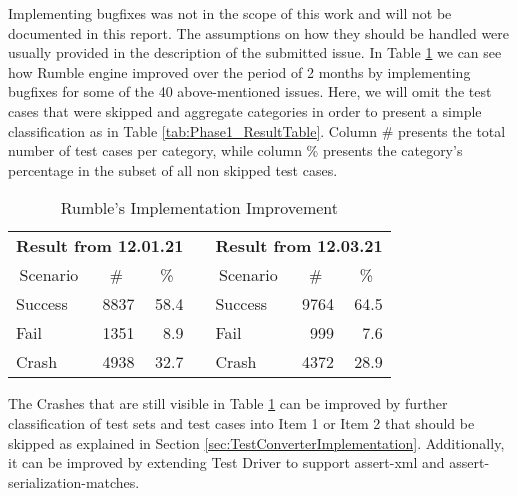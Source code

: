 Implementing bugfixes was not in the scope of this work and will not be documented in this report. The assumptions on how they should be handled were usually provided in the description of the submitted issue. In Table \ref{tab:bugsimprovement} we can see how Rumble engine improved over the period of 2 months by implementing bugfixes for some of the 40 above-mentioned issues. Here, we will omit the test cases that were skipped and aggregate categories in order to present a simple classification as in Table \ref{tab:Phase1_ResultTable}. Column \# presents the total number of test cases per category, while column \% presents the category's percentage in the subset of all non skipped test cases.
 
\begin{table}[h!]
	\centering
	\begin{tabular}{|l|r|r|r|l|r|r|}
		\cline{1-3} \cline{5-7}
		\multicolumn{3}{|c|}{\textbf{Result from 12.01.21}}                                & \multicolumn{1}{l|}{}          & \multicolumn{3}{c|}{\textbf{Result from 12.03.21}}                                \\ \cline{1-3} \cline{5-7} 
		\multicolumn{1}{|c|}{Scenario} & \multicolumn{1}{c|}{\#} & \multicolumn{1}{c|}{\%} & \multicolumn{1}{c|}{\textbf{}} & \multicolumn{1}{c|}{Scenario} & \multicolumn{1}{c|}{\#} & \multicolumn{1}{c|}{\%} \\ \cline{1-3} \cline{5-7} 
		Success                        & 8837                    & 58.4                    &                                & Success                       & 9764                    & 64.5                    \\ \cline{1-3} \cline{5-7} 
		Fail                           & 1351                    & 8.9                     &                                & Fail                          & 999                     & 7.6                     \\ \cline{1-3} \cline{5-7} 
		Crash                          & 4938                    & 32.7                    &                                & Crash                         & 4372                    & 28.9                    \\ \cline{1-3} \cline{5-7} 
	\end{tabular}
	\caption{Rumble's Implementation Improvement}
	\label{tab:bugsimprovement}
\end{table}

The Crashes that are still visible in Table \ref{tab:bugsimprovement} can be improved by further classification of test sets and test cases into Item 1 or Item 2 that should be skipped as explained in Section \ref{sec:TestConverterImplementation}. Additionally, it can be improved by extending Test Driver to support assert-xml and assert-serialization-matches.

